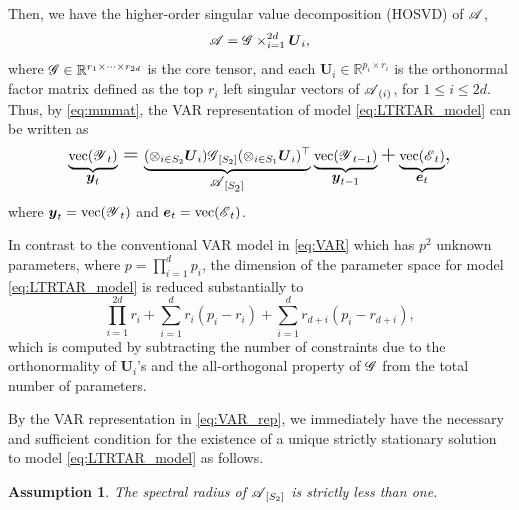 \documentclass[12pt]{article}
\newtheorem{assumption}{Assumption}
\newcommand{\bm}{\boldsymbol}
\newcommand{\cm}[1]{\mbox{\boldmath$\mathscr{#1}$}}
\begin{document}
Then, we have the higher-order singular value decomposition (HOSVD)  of $\cm{A}$,
\begin{equation}
\label{eq:Tucker_model}
\cm{A}=\cm{G}\times_{i=1}^{2d}\bm{U}_i,
\end{equation}
where $\cm{G}\in\mathbb{R}^{r_1\times\cdots\times r_{2d}}$ is the core tensor, and each $\bm{U}_i\in\mathbb{R}^{p_i\times r_i}$ is the orthonormal factor matrix defined as the top $r_i$ left singular vectors of $\cm{A}_{(i)}$, for $1\leq i\leq 2d$. Thus, by \eqref{eq:mmmat}, the VAR representation of model \eqref{eq:LTRTAR_model} can be written as
\begin{equation} \label{eq:VAR_rep}
\underbrace{\text{vec}(\cm{Y}_t)}_{\Large{\bm{y}_t}}=\underbrace{(\otimes_{i\in S_2}\bm{U}_i)\cm{G}_{[S_2]}(\otimes_{i\in S_1}\bm{U}_i)^\top}_{\Large{\normalsize{\cm{A}}_{[S_2]}}} \underbrace{\text{vec}(\cm{Y}_{t-1})}_{\Large{\bm{y}_{t-1}}}+\underbrace{\text{vec}(\cm{E}_t)}_{\Large{\bm{e}_t}},
\end{equation}
where $\bm{y}_t=\text{vec}(\cm{Y}_t)$ and $\bm{e}_t=\text{vec}(\cm{E}_t)$.

In contrast to the conventional VAR model in \eqref{eq:VAR} which has $p^2$ unknown parameters, where $p=\prod_{i=1}^{d}p_i$, the dimension of the parameter space for model \eqref{eq:LTRTAR_model} is reduced substantially to
\begin{equation}\label{eq:dim}
\prod_{i=1}^{2d}r_i+\sum_{i=1}^dr_i(p_i-r_i)+\sum_{i=1}^dr_{d+i}(p_i-r_{d+i}),
\end{equation}
which is computed by subtracting the number of constraints due to the orthonormality of $\bm{U}_i$'s and the all-orthogonal property of $\cm{G}$ from the total number of parameters.

By the VAR representation in  \eqref{eq:VAR_rep}, we immediately have the necessary and sufficient condition for the existence of a unique strictly stationary solution to model \eqref{eq:LTRTAR_model}  as follows.
\begin{assumption}
	\label{asmp:stationary}
	The spectral radius of $\cm{A}_{[S_2]}$ is strictly less than one.
\end{assumption}

\end{document}

